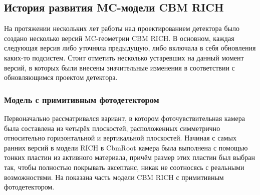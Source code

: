 %                                                                          

\subsection{История развития MC-модели CBM RICH}\label{sec:secRICHgeoHistory}

На протяжении нескольких лет работы над проектированием детектора было создано несколько версий MC-геометрии CBM RICH. В основном, каждая следующая версия либо уточняла предыдущую, либо включала в себя обновления каких-то подсистем. Стоит отметить несколько устаревших на данный момент версий, в которых были внесены значительные изменения в соответствии с обновляющимся проектом детектора.

\subsubsection{Модель с примитивным фотодетектором}\label{sec:secPrimitiveCamera}

Первоначально рассматривался вариант, в котором фоточувствительная камера была составлена из четырёх плоскостей, расположенных симметрично относительно горизонтальной и вертикальной плоскостей. Начиная с самых ранних версий в модели RICH в CbmRoot камера была выполнена с помощью тонких пластин из активного материала, причём размер этих пластин был выбран так, чтобы полностью покрывать аксептанс, никак не соотносясь с реальными возможностями. На  показана часть модели CBM RICH с примитивным фотодетектором.


